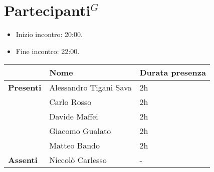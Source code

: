 \section{\gls{Partecipanti}$^G$}

\begin{itemize}
	\item Inizio incontro: 20:00.
	\item Fine incontro: 22:00.
\end{itemize}


\begin{center}
	{\renewcommand{\arraystretch}{1.5}
		\begin{tabular}{lll}
			                  & \textbf{Nome}          & \textbf{Durata presenza} \\
			\hline
			\textbf{Presenti} & Alessandro Tigani Sava & 2h                       \\
			                  & Carlo Rosso            & 2h                       \\
			                  & Davide Maffei          & 2h                       \\
			                  & Giacomo Gualato        & 2h                       \\
			                  & Matteo Bando           & 2h                       \\
			\hline
			\textbf{Assenti}  & Niccolò Carlesso       & -                       \\
		\end{tabular}
	}
\end{center}
